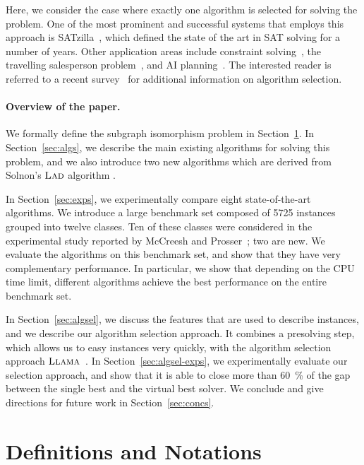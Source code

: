 \documentclass{llncs}
\newcommand{\LAD}{$\textsc{Lad}$\xspace}
\newcommand{\LLAMA}{$\textsc{Llama}$\xspace}
\begin{document}
Here, we consider the case where exactly one algorithm is selected for solving the problem. One of
the most prominent and successful systems that employs this approach is
SATzilla~\cite{xu_satzilla_2008}, which defined the state of the art in SAT solving for a number of
years. Other application areas include constraint solving~\cite{omahony_using_2008}, the travelling
salesperson problem~\cite{kotthoff_improving_2015}, and AI planning~\cite{seipp_learning_2012}.
The interested reader is referred to a recent survey~\cite{kotthoff_algorithm_2014} for additional
information on algorithm selection.

\paragraph{Overview of the paper.}
We formally define the subgraph isomorphism problem in Section~\ref{sec:defs}.
In Section~\ref{sec:algs}, we describe the main existing algorithms for solving
this problem, and we also introduce two new algorithms which are derived from
Solnon's \LAD algorithm \cite{Solnon:2010}.

In Section~\ref{sec:exps}, we experimentally compare eight state-of-the-art
algorithms. We introduce a large benchmark set composed of 5725 instances
grouped into twelve classes. Ten of these classes were considered in the
experimental study reported by McCreesh and Prosser~\cite{McCreesh:2015}; two
are new. We evaluate the algorithms on this benchmark set, and show that they
have very complementary performance. In particular, we show that depending on
the CPU time limit, different algorithms achieve the best performance on the
entire benchmark set.

In Section~\ref{sec:algsel}, we discuss the features that are used to describe
instances, and we describe our algorithm selection approach. It combines a
presolving step, which allows us to easy instances very quickly, with the
algorithm selection approach \LLAMA~\cite{kotthoff_llama_2013}.
In Section~\ref{sec:algsel-exps}, we experimentally evaluate our selection
approach, and show that it is able to close more than \SI{60}{\percent} of the
gap between the single best and the virtual best solver. We conclude and give
directions for future work in Section~\ref{sec:concs}.

\section{Definitions and Notations}\label{sec:defs}
\end{document}
